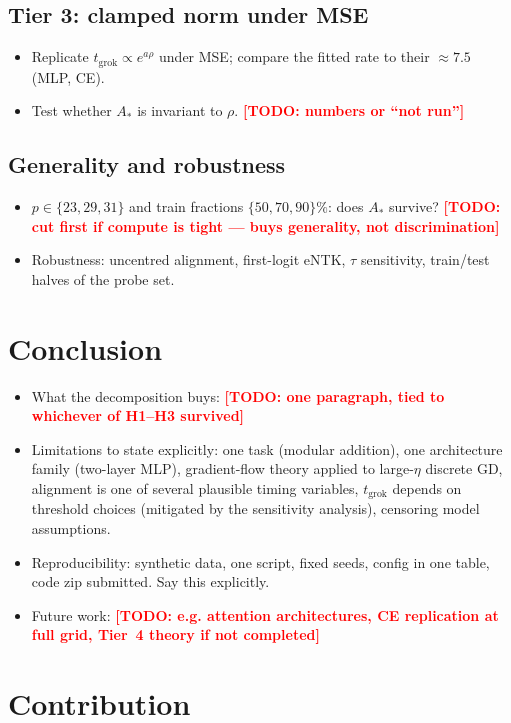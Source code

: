 \documentclass[a4paper,11pt]{article} %
\newcommand{\TODO}[1]{\textcolor{red}{\textbf{[TODO: #1]}}}
\newcommand{\tgrok}{t_{\mathrm{grok}}}
\newcommand{\Astar}{A_{*}}
\begin{document}
\subsection{Tier 3: clamped norm under MSE}
\begin{itemize}
	\item Replicate $\tgrok\propto e^{a\rho}$ \citep{truong2026norm} under MSE;
		compare the fitted rate to their $\approx7.5$ (MLP, CE).
	\item Test whether $\Astar$ is invariant to $\rho$. \TODO{numbers or
		``not run''}
\end{itemize}

\subsection{Generality and robustness}
\begin{itemize}
	\item $p\in\{23,29,31\}$ and train fractions $\{50,70,90\}\%$: does $\Astar$
		survive? \TODO{cut first if compute is tight --- buys generality, not
		discrimination}
	\item Robustness: uncentred alignment, first-logit eNTK, $\tau$ sensitivity,
		train/test halves of the probe set.
\end{itemize}

\section{Conclusion}

\begin{itemize}
	\item What the decomposition buys: \TODO{one paragraph, tied to whichever of
		H1--H3 survived}
	\item Limitations to state explicitly: one task (modular addition), one
		architecture family (two-layer MLP), gradient-flow theory applied to
		large-$\eta$ discrete GD, alignment is one of several plausible timing
		variables, $\tgrok$ depends on threshold choices (mitigated by the
		sensitivity analysis), censoring model assumptions.
	\item Reproducibility: synthetic data, one script, fixed seeds, config in one
		table, code zip submitted. Say this explicitly.
	\item Future work: \TODO{e.g. attention architectures, CE replication at full
		grid, Tier~4 theory if not completed}
\end{itemize}

\section*{Contribution}
\end{document}
